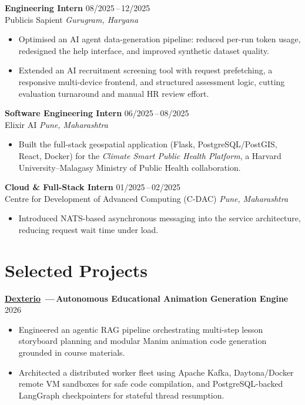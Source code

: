 \documentclass[11pt,a4paper]{article}
\begin{document}
\textbf{Engineering Intern} \hfill 08/2025\,--\,12/2025\\
Publicis Sapient \hfill \textit{Gurugram, Haryana}
\begin{itemize}
  \item Optimised an AI agent data-generation pipeline: reduced per-run
        token usage, redesigned the help interface, and improved synthetic
        dataset quality.
  \item Extended an AI recruitment screening tool with request
        prefetching, a responsive multi-device frontend, and structured
        assessment logic, cutting evaluation turnaround and manual HR
        review effort.
\end{itemize}

\vspace{0.4em}

\textbf{Software Engineering Intern} \hfill 06/2025\,--\,08/2025\\
Elixir AI \hfill \textit{Pune, Maharashtra}
\begin{itemize}
  \item Built the full-stack geospatial application (Flask, PostgreSQL/PostGIS,
        React, Docker) for the \textit{Climate Smart Public Health Platform},
        a Harvard University--Malagasy Ministry of Public Health collaboration.
\end{itemize}

\vspace{0.4em}

\textbf{Cloud \& Full-Stack Intern} \hfill 01/2025\,--\,02/2025\\
Centre for Development of Advanced Computing (C-DAC) \hfill \textit{Pune, Maharashtra}
\begin{itemize}
  \item Introduced NATS-based asynchronous messaging into the service
        architecture, reducing request wait time under load.
\end{itemize}


\section{Selected Projects}

\textbf{\href{https://github.com/jayraj-kl/dexterio}{Dexterio}%
\,---\,Autonomous Educational Animation Generation Engine}
\hfill 2026
\begin{itemize}
  \item Engineered an agentic RAG pipeline orchestrating multi-step lesson storyboard planning and modular Manim animation code generation grounded in course materials.
  \item Architected a distributed worker fleet using Apache Kafka, Daytona/Docker remote VM sandboxes for safe code compilation, and PostgreSQL-backed LangGraph checkpointers for stateful thread resumption.
\end{itemize}
\end{document}
